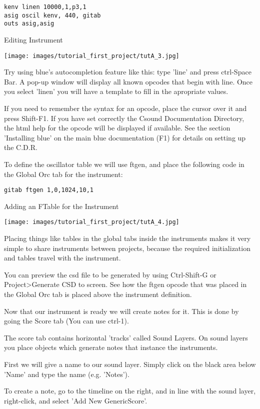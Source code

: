 \begin{verbatim}
kenv linen 10000,1,p3,1
asig oscil kenv, 440, gitab
outs asig,asig
\end{verbatim}

Editing Instrument

\texttt{[image: images/tutorial\_first\_project/tutA\_3.jpg]}

Try using blue's autocompletion feature like this: type 'line' and press
ctrl-Space Bar. A pop-up window will display all known opcodes that
begin with line. Once you select 'linen' you will have a template to
fill in the apropriate values.

If you need to remember the syntax for an opcode, place the cursor over
it and press Shift-F1. If you have set correctly the Csound
Documentation Directory, the html help for the opcode will be displayed
if available. See the section 'Installing blue' on the main blue
documentation (F1) for details on setting up the C.D.R.

To define the oscillator table we will use ftgen, and place the
following code in the Global Orc tab for the instrument:

\begin{verbatim}
gitab ftgen 1,0,1024,10,1
\end{verbatim}

Adding an FTable for the Instrument

\texttt{[image: images/tutorial\_first\_project/tutA\_4.jpg]}

Placing things like tables in the global tabs inside the instruments
makes it very simple to share instruments between projects, because the
required initialization and tables travel with the instrument.

You can preview the csd file to be generated by using Ctrl-Shift-G or
Project\textgreater{}Generate CSD to screen. See how the ftgen opcode
that was placed in the Global Orc tab is placed above the instrument
definition.

Now that our instrument is ready we will create notes for it. This is
done by going the Score tab (You can use ctrl-1).

The score tab contains horizontal 'tracks' called Sound Layers. On sound
layers you place objects which generate notes that instance the
instruments.

First we will give a name to our sound layer. Simply click on the black
area below 'Name' and type the name (e.g. 'Notes').

To create a note, go to the timeline on the right, and in line with the
sound layer, right-click, and select 'Add New GenericScore'.

